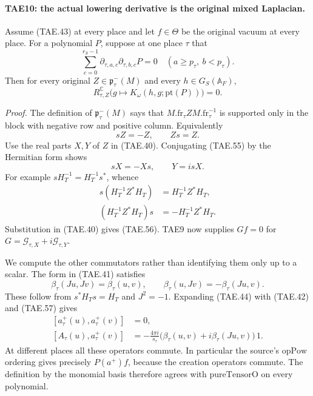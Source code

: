 \paragraph{TAE10: the actual lowering derivative is the original mixed Laplacian.}
\label{claim:TAE10}
Assume (TAE.43) at every place and let \(f\in\Theta\) be the
original vacuum at every place.  For a polynomial \(P\), suppose
at one place \(\tau\) that
\[
       \sum_{c=0}^{r_S-1}
           \partial_{\tau,a,c}\partial_{\tau,b,c}P=0
           \quad(a\ge p_\tau,\ b<p_\tau).
 \tag{TAE.53}
\]
Then for every original \(Z\in\mathfrak p^-_\tau(M)\)
and every \(h\in G_S(\mathbb A_F)\),
\[
 R_{\tau,Z}^{\mathbb C}
       \bigl(g\mapsto K_\omega(h,g;\mathrm{pt}(P))\bigr)=0 .
 \tag{TAE.54}
\]

\emph{Proof.}
The definition of \(\mathfrak p^-_\tau(M)\) says that
\(M.\mathrm{fr}_\tau ZM.\mathrm{fr}_\tau^{-1}\) is supported
only in the block with negative row and positive column.
Equivalently
\[
                         sZ=-Z,\qquad Zs=Z .
 \tag{TAE.55}
\]
Use the real parts \(X,Y\) of \(Z\) in (TAE.40).
Conjugating (TAE.55) by the Hermitian form shows
\[
        sX=-Xs,\qquad Y=isX .
 \tag{TAE.56}
\]
For example \(sH_T^{-1}=H_T^{-1}s^*\), whence
\[
 \begin{aligned}
 s(H_T^{-1}Z^*H_T)&=H_T^{-1}Z^*H_T,\\
 (H_T^{-1}Z^*H_T)s&=-H_T^{-1}Z^*H_T.
 \end{aligned}
\]
Substitution in (TAE.40) gives (TAE.56).
TAE9 now supplies \(Gf=0\) for
\(G=\mathcal G_{\tau,X}+i\mathcal G_{\tau,Y}\).

We compute the other commutators rather than identifying
them only up to a scalar.  The form in (TAE.41) satisfies
\[
 \beta_\tau(Ju,Jv)=\beta_\tau(u,v),\qquad
 \beta_\tau(u,Jv)=-\beta_\tau(Ju,v).
 \tag{TAE.57}
\]
These follow from \(s^*H_Ts=H_T\) and \(J^2=-1\).
Expanding (TAE.44) with (TAE.42) and (TAE.57) gives
\[
 \begin{split}
 [a_\tau^+(u),a_\tau^+(v)]&=0,\\
 [A_\tau(u),a_\tau^+(v)]
   &=-\frac{4\pi i}{s_\tau}
      \bigl(\beta_\tau(u,v)+i\beta_\tau(Ju,v)\bigr)\,1 .
 \end{split}
 \tag{TAE.58}
\]
At different places all these operators commute.
In particular the source's \(\mathrm{opPow}\) ordering
gives precisely \(P(a^+)f\), because the creation
operators commute.  The definition by the monomial basis
therefore agrees with \(\mathrm{pureTensorO}\) on every
polynomial.

